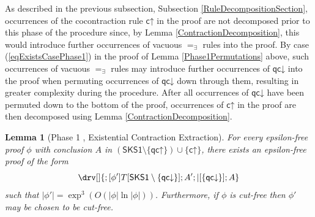 \documentclass[10pt]{article}
\newtheorem{lemma}[theorem]{Lemma}
\theoremstyle{definition}\newtheorem{remark}[theorem]{Remark}
\theoremstyle{definition}\newtheorem{example}[theorem]{Example}
\theoremstyle{definition}\newtheorem{definition}[theorem]{Definition}
\newcommand{\SKSqDecomp}{{\mathsf{SKS1}}}
\newcommand{\cUp}{{\mathsf{c\mathord\uparrow}}}
\newcommand{\qcUp}{{\mathsf{qc\mathord\uparrow}}}
\newcommand{\qcDown}{{\mathsf{qc\mathord\downarrow}}}
\newcommand{\eqExists}{=_{\exists}}
\begin{document}
	As described in the previous subsection, Subsection \ref{RuleDecompositionSection}, occurrences of the cocontraction rule $\cUp$ in the proof are not decomposed prior to this phase of the procedure since, by Lemma \ref{ContractionDecomposition}, this would introduce further occurrences of vacuous $\eqExists$ rules into the proof. By case (\ref{eqExistsCasePhase1}) in the proof of Lemma \ref{Phase1Permutations} above, such occurrences of vacuous $\eqExists$ rules may introduce further occurrences of $\qcDown$ into the proof when permuting occurrences of $\qcDown$ down through them, resulting in greater complexity during the procedure. After all occurrences of $\qcDown$ have been permuted down to the bottom of the proof, occurrences of $\cUp$ in the proof are then decomposed using Lemma \ref{ContractionDecomposition}.
	
	\begin{lemma}[Phase 1 , Existential Contraction Extraction]\label{Phase1}
		For every epsilon-free proof $\phi$ with conclusion $A$ in $(\SKSqDecomp \setminus \{\qcUp\}) \cup \{\cUp\}$, there exists an epsilon-free proof of the form
		\[
		\drv[] {
			; [\phi']T[\SKSqDecomp \setminus \{\qcDown\}] ; A' ; |[\{\qcDown\}] ; A
		}
		\]
		such that $| \phi' | = \exp^3 (O(| \phi | \ln | \phi |))$. Furthermore, if $\phi$ is cut-free then $\phi'$ may be chosen to be cut-free.
	\end{lemma}
	
\end{document}
